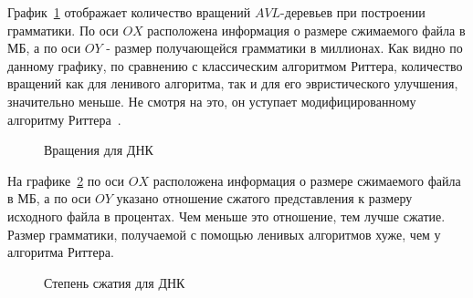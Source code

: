\documentclass[12pt,a4paper]{extarticle}
\theoremstyle{break}
\begin{document}
График~\ref{dna_rotations} отображает количество вращений $AVL$-деревьев при
построении грамматики. По оси $OX$ расположена информация о
размере сжимаемого файла в МБ, а по оси $OY$ - размер получающейся
грамматики в миллионах. Как видно по данному графику, по сравнению с
классическим алгоритмом Риттера, количество вращений как для ленивого алгоритма, так и для его эвристического улучшения, значительно меньше. Не смотря на это, он уступает
модифицированному алгоритму Риттера~\cite{slp}. 

\begin{figure}[!h]
    \caption{Вращения для ДНК}
    \label{dna_rotations}
\end{figure}

На графике~\ref{dna_compression_ratio} по оси $OX$ расположена информация о
размере сжимаемого файла в МБ, а по оси $OY$ указано отношение сжатого
представления к размеру исходного файла в процентах. Чем меньше это отношение,
тем лучше сжатие. Размер грамматики, получаемой с
помощью ленивых алгоритмов хуже, чем у алгоритма Риттера.

\begin{figure}[!h]
    \caption{Степень сжатия для ДНК}
    \label{dna_compression_ratio} 
\end{figure}
\end{document}
